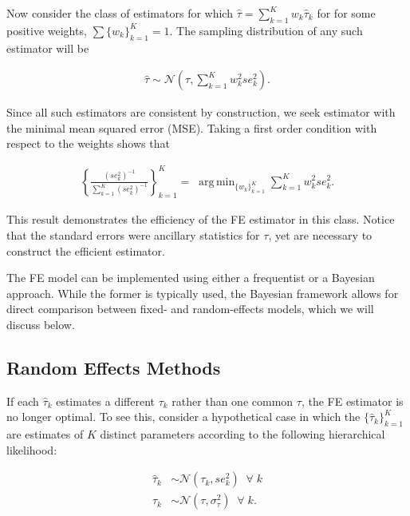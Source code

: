\documentclass[12pt]{article}
\DeclareMathOperator*{\argmin}{arg\,min}
\begin{document}
Now consider the class of estimators for which $\hat{\tau} = \sum_{k=1}^{K} w_k \hat{\tau}_k$ for 
for some positive weights, $\sum \{w_k\}_{k=1}^K =1$.
The sampling distribution of any such estimator will be

\begin{equation}
\begin{aligned}
\hat{\tau} \sim \mathcal{N}(\tau, \sum_{k=1}^{K} w_k^2 se^2_{k}) .
\end{aligned}
\end{equation}

Since all such estimators are consistent by construction, we seek estimator with the minimal mean squared error (MSE). Taking a first order condition with respect to the weights shows that

\begin{equation}\label{fe}
\begin{aligned}
\left\{ \frac{(se^2_k)^{-1}}{\sum_{k=1}^K(se^2_k)^{-1}} \right\}_{k=1}^K = \; \argmin_{ \{w_k\}_{k=1}^K  } \sum_{k=1}^{K} w_k^2 se^2_{k}.
\end{aligned}
\end{equation}

This result demonstrates the efficiency of the FE estimator in this class. Notice that the standard errors were ancillary statistics for $\tau$, yet are necessary to construct the efficient estimator. 

The FE model can be implemented using either a frequentist or a Bayesian approach. While the former is typically used, the Bayesian framework allows for direct comparison between fixed- and random-effects models, which we will discuss below. 



\subsection{Random Effects Methods}

If each $\hat{\tau}_k$ estimates a different $\tau_k$ rather than one common $\tau$, the FE estimator is no longer optimal. To see this, consider a hypothetical case in which the $\{\hat{\tau}_k\}_{k=1}^K$ are estimates of $K$ distinct parameters according to the following hierarchical likelihood:

\begin{equation}\label{rubin}
\begin{aligned}
\hat{\tau}_k &\sim \mathcal{N}(\tau_k, se^2_{k}) \; \; \forall \;k\\
\tau_k &\sim \mathcal{N}(\tau, \sigma^2_{\tau}) \; \; \forall\; k.
\end{aligned}
\end{equation}
\end{document}
